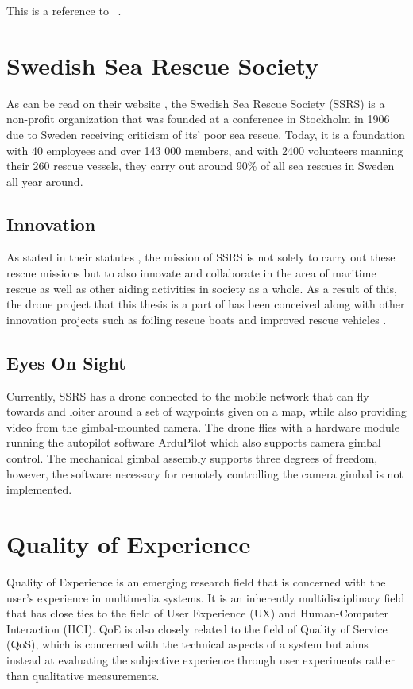 \documentclass[nofilelist]{cslthse-msc}
\begin{document}
This is a reference to ~\cite{Industry4}.

\section{Swedish Sea Rescue Society}
As can be read on their website \cite{ssrs}, the Swedish Sea Rescue Society (SSRS) is a non-profit organization that was founded at a conference in Stockholm in 1906 due to Sweden receiving criticism of its' poor sea rescue. Today, it is a foundation with 40 employees and over 143 000 members, and with 2400 volunteers manning their 260 rescue vessels, they carry out around 90\% of all sea rescues in Sweden all year around.

\subsection{Innovation}
 As stated in their statutes \cite{ssrs-statues}, the mission of SSRS is not solely to carry out these rescue missions but to also innovate and collaborate in the area of maritime rescue as well as other aiding activities in society as a whole. As a result of this, the drone project that this thesis is a part of has been conceived along with other innovation projects such as foiling rescue boats and improved rescue vehicles \cite{surtsey-innovation}.

\subsection{Eyes On Sight}
Currently, SSRS has a drone connected to the mobile network that can fly towards and loiter around a set of waypoints given on a map, while also providing video from the gimbal-mounted camera. The drone flies with a hardware module running the autopilot software ArduPilot which also supports camera gimbal control. The mechanical gimbal assembly supports three degrees of freedom, however, the software necessary for remotely controlling the camera gimbal is not implemented.

\section{Quality of Experience}
Quality of Experience is an emerging research field that is concerned with the user's experience in multimedia systems. It is an inherently multidisciplinary field that has close ties to the field of User Experience (UX) and Human-Computer Interaction (HCI). QoE is also closely related to the field of Quality of Service (QoS), which is concerned with the technical aspects of a system but aims instead at evaluating the subjective experience through user experiments rather than qualitative measurements.
\end{document}
